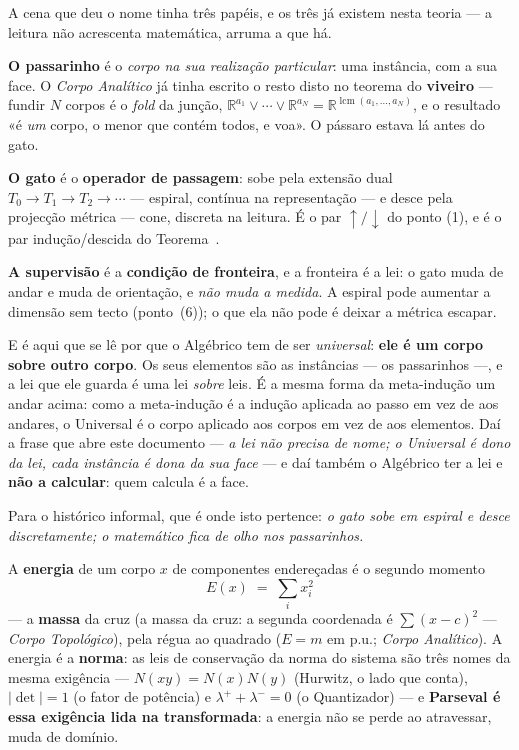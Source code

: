 \documentclass[livro.tex]{subfiles}
\begin{document}
\begin{observacao}\label{obs:passarinho}
A cena que deu o nome tinha três papéis, e os três já existem nesta
teoria --- a leitura não acrescenta matemática, arruma a que há.

\medskip
\noindent\textbf{O passarinho} é o \emph{corpo na sua realização
particular}: uma instância, com a sua face. O \emph{Corpo Analítico} já
tinha escrito o resto disto no teorema do \textbf{viveiro} --- fundir $N$
corpos é o \emph{fold} da junção,
$\mathbb{R}^{a_1}\vee\cdots\vee\mathbb{R}^{a_N}
=\mathbb{R}^{\operatorname{lcm}(a_1,\ldots,a_N)}$, e o resultado «é
\emph{um} corpo, o menor que contém todos, e voa». O pássaro estava lá
antes do gato.

\medskip
\noindent\textbf{O gato} é o \textbf{operador de passagem}: sobe pela
extensão dual $T_0\to T_1\to T_2\to\cdots$ --- espiral, contínua na
representação --- e desce pela projecção métrica --- cone, discreta na
leitura. É o par $\uparrow/\downarrow$ do ponto (1), e é o par
indução/descida do Teorema~.

\medskip
\noindent\textbf{A supervisão} é a \textbf{condição de fronteira}, e a
fronteira é a lei: o gato muda de andar e muda de orientação, e
\emph{não muda a medida}. A espiral pode aumentar a dimensão sem tecto
(ponto~(6)); o que ela não pode é deixar a métrica escapar.

\medskip
E é aqui que se lê por que o Algébrico tem de ser \emph{universal}:
\textbf{ele é um corpo sobre outro corpo}. Os seus elementos são as
instâncias --- os passarinhos ---, e a lei que ele guarda é uma lei
\emph{sobre} leis. É a mesma forma da meta-indução um andar acima: como a
meta-indução é a indução aplicada ao passo em vez de aos andares, o
Universal é o corpo aplicado aos corpos em vez de aos elementos. Daí a
frase que abre este documento --- \emph{a lei não precisa de nome; o
Universal é dono da lei, cada instância é dona da sua face} --- e daí
também o Algébrico ter a lei e \textbf{não a calcular}: quem calcula é a
face.

\medskip
\noindent Para o histórico informal, que é onde isto pertence:
\emph{o gato sobe em espiral e desce discretamente; o matemático fica de
olho nos passarinhos.}
\end{observacao}

\begin{definicao}[energia]\label{def:energia}
A \textbf{energia} de um corpo $x$ de componentes endereçadas é o
segundo momento
\[
\boxed{E(x)\;=\;\sum_i x_i^{2}}
\]
--- a \textbf{massa} da cruz (a massa da cruz: a segunda
coordenada é $\sum(x-c)^{2}$ --- \emph{Corpo Topológico}), pela régua ao quadrado ($E=m$ em p.u.;
\emph{Corpo Analítico}). A energia é a \textbf{norma}: as leis de
conservação da norma do sistema são três nomes da mesma exigência ---
$N(xy)=N(x)N(y)$ (Hurwitz, o lado que conta), $|\det|=1$ (o fator de
potência) e $\lambda^{+}+\lambda^{-}=0$ (o Quantizador) --- e
\textbf{Parseval é essa exigência lida na transformada}: a energia não
se perde ao atravessar, muda de domínio.
\end{definicao}
\end{document}
